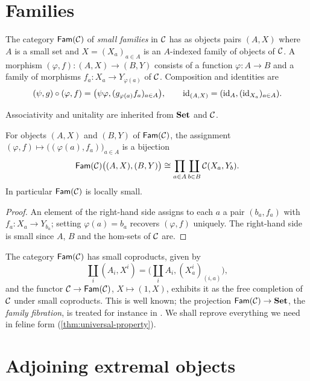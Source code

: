\section{Families}\label{sec:families}

\begin{definition}\label{def:Fam}
The category $\mathsf{Fam}(\mathcal{C})$ of \emph{small families} in $\mathcal{C}$ has as objects
pairs $(A,X)$ where $A$ is a small set and $X=(X_a)_{a\in A}$ is an
$A$-indexed family of objects of $\mathcal{C}$. A morphism $(\varphi,f)\colon(A,X)\to(B,Y)$
consists of a function $\varphi\colon A\to B$ and a family of morphisms
$f_a\colon X_a\to Y_{\varphi(a)}$ of $\mathcal{C}$. Composition and identities are
\[
(\psi,g)\circ(\varphi,f)=\bigl(\psi\varphi,(g_{\varphi(a)}f_a)_{a\in A}\bigr),
\qquad \mathrm{id}_{(A,X)}=(\mathrm{id}_A,(\mathrm{id}_{X_a})_{a\in A}).
\]
\end{definition}

Associativity and unitality are inherited from $\mathbf{Set}$ and $\mathcal{C}$.

\begin{lemma}\label{lem:Fam-hom}
For objects $(A,X)$ and $(B,Y)$ of $\mathsf{Fam}(\mathcal{C})$, the assignment
$(\varphi,f)\mapsto\bigl((\varphi(a),f_a)\bigr)_{a\in A}$ is a bijection
\[
\mathsf{Fam}(\mathcal{C})\bigl((A,X),(B,Y)\bigr)\cong\prod_{a\in A}\coprod_{b\in B}\mathcal{C}(X_a,Y_b).
\]
In particular $\mathsf{Fam}(\mathcal{C})$ is locally small.
\end{lemma}

\begin{proof}
An element of the right-hand side assigns to each $a$ a pair $(b_a,f_a)$ with
$f_a\colon X_a\to Y_{b_a}$; setting $\varphi(a)=b_a$ recovers $(\varphi,f)$
uniquely. The right-hand side is small since $A$, $B$ and the hom-sets of $\mathcal{C}$
are.
\end{proof}

\begin{remark}\label{rem:Fam-classical}
The category $\mathsf{Fam}(\mathcal{C})$ has small coproducts, given by
\[
\textstyle\coprod_i(A_i,X^i)=\bigl(\coprod_iA_i,(X^i_a)_{(i,a)}\bigr),
\]
and the functor
$\mathcal{C}\to\mathsf{Fam}(\mathcal{C})$, $X\mapsto(1,X)$, exhibits it as the free completion of $\mathcal{C}$
under small coproducts. This is well known; the projection $\mathsf{Fam}(\mathcal{C})\to\mathbf{Set}$,
the \emph{family fibration}, is treated for instance in \cite{Jacobs1999}. We
shall reprove everything we need in feline
form (\cref{thm:universal-property}).
\end{remark}

\section{Adjoining extremal objects}\label{sec:joins}

